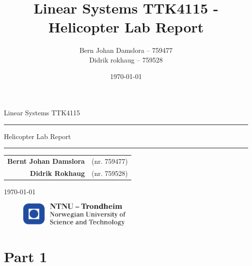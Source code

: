 \documentclass{article}
\title{Linear Systems TTK4115 - Helicopter Lab Report}
\author{Bern Johan Damslora -- 759477 \\ Didrik rokhaug -- 759528}
\date{\today}
\begin{document}
\begin{titlepage}
    \begin{center}
    	\large
    	Linear Systems TTK4115
    \end{center}
    \vspace{\fill}
    \rule{\linewidth}{0.5mm}
    \begin{center}
    	\huge
    	Helicopter Lab Report
    \end{center}
	\rule{\linewidth}{0.5mm}
	\vspace{\fill}

    \begin{table}[H]
    	\centering
    	\large
    	\begin{tabular}{rl}
    		\textbf{Bernt Johan Damslora} & (nr. 759477) \\
    		\textbf{Didrik Rokhaug} &  (nr. 759528)
    	
    	\end{tabular}
    \end{table}
    \vspace{\fill}
    \begin{center}
    	\large
    	\today
    \end{center}
	\vspace{\fill}
    \begin{figure}[H]
    \centering
    \includegraphics[width=0.5\textwidth]{images/logontnu_eng}
    \end{figure}
    \thispagestyle{empty}
\end{titlepage}

\tableofcontents
\thispagestyle{empty} %
\newpage    

\setcounter{page}{1}
\section{Part 1}



\newpage

\end{document}
